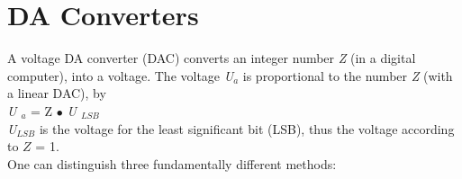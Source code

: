 \section{DA Converters}

A  voltage DA converter (DAC) converts an integer number \textit{Z} (in a digital computer), into a voltage. The voltage \textit{U${}_{a}$} is proportional to the number \textit{Z} (with a linear DAC), by\\

\textit{U ${}_{a}$} = Z $\mathrm{\bullet}$ \textit{U ${}_{LSB}$}\\

\textit{U${}_{LSB}$} is the voltage for the least significant bit (LSB), thus the voltage according to \textit{$Z$} = 1.\\
\os{\newpage}
One can distinguish three fundamentally different methods:

\os{\hspace{2cm}}

    

